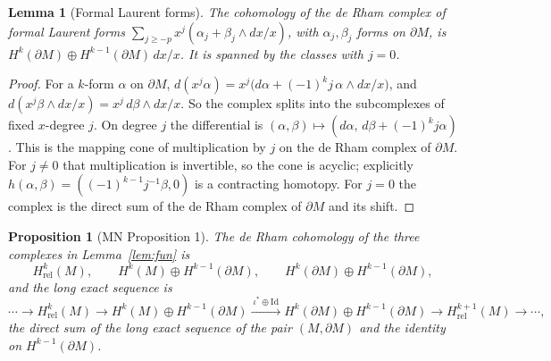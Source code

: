 \documentclass[11pt,oneside,reqno]{article}
\newcommand{\Hrel}{H_{\mathrm{rel}}}
\theoremstyle{plain}
\newtheorem{proposition}[theorem]{Proposition}
\newtheorem{lemma}[theorem]{Lemma}
\theoremstyle{definition}
\theoremstyle{remark}
\begin{document}
\begin{lemma}[Formal Laurent forms]\label{lem:formaldR}
The cohomology of the de Rham complex of formal Laurent forms
\(\sum_{j\ge-p}x^j(\alpha_j+\beta_j\wedge dx/x)\), with
\(\alpha_j,\beta_j\) forms on \(\partial M\), is
\(H^k(\partial M)\oplus H^{k-1}(\partial M)\,dx/x\). It is spanned by the
classes with \(j=0\).
\end{lemma}

\begin{proof}
For a \(k\)-form \(\alpha\) on \(\partial M\),
\(d(x^j\alpha)=x^j\bigl(d\alpha+(-1)^kj\,\alpha\wedge dx/x\bigr)\), and
\(d(x^j\beta\wedge dx/x)=x^j\,d\beta\wedge dx/x\). So the complex splits
into the subcomplexes of fixed \(x\)-degree \(j\). On degree \(j\) the
differential is
\((\alpha,\beta)\mapsto(d\alpha,\,d\beta+(-1)^kj\alpha)\). This is the
mapping cone of multiplication by \(j\) on the de Rham complex of
\(\partial M\). For \(j\ne0\) that multiplication is invertible, so the
cone is acyclic; explicitly
\(h(\alpha,\beta)=((-1)^{k-1}j^{-1}\beta,0)\) is a contracting homotopy.
For \(j=0\) the complex is the direct sum of the de Rham complex of
\(\partial M\) and its shift.
\end{proof}

\begin{proposition}[MN Proposition 1]\label{prop:dR}
The de Rham cohomology of the three complexes in Lemma~\ref{lem:fun} is
\[
 \Hrel^k(M),\qquad H^k(M)\oplus H^{k-1}(\partial M),\qquad
 H^k(\partial M)\oplus H^{k-1}(\partial M),
\]
and the long exact sequence is \cite[(29)]{MN}
\[
 \cdots\to\Hrel^k(M)\to H^k(M)\oplus H^{k-1}(\partial M)
 \xrightarrow{\ \iota^*\oplus\mathrm{Id}\ }H^k(\partial M)\oplus
 H^{k-1}(\partial M)\to\Hrel^{k+1}(M)\to\cdots ,
\]
the direct sum of the long exact sequence of the pair \((M,\partial M)\)
and the identity on \(H^{k-1}(\partial M)\).
\end{proposition}
\end{document}
